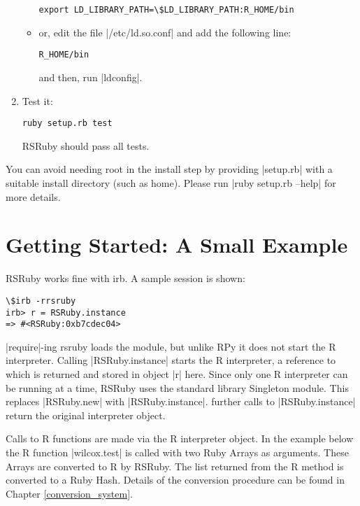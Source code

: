 \documentclass[a4paper,12pt]{book}
\begin{document}
\begin{enumerate}
\begin{itemize}
\begin{Verbatim}
export LD_LIBRARY_PATH=\$LD_LIBRARY_PATH:R_HOME/bin
\end{Verbatim}

\item or, edit the file |/etc/ld.so.conf| and add the following line:

\begin{Verbatim}
R_HOME/bin
\end{Verbatim}

  and then, run |ldconfig|.
\end{itemize}

\item Test it:

\begin{Verbatim}
ruby setup.rb test
\end{Verbatim}

RSRuby should pass all tests.

\end{enumerate}

You can avoid needing root in the install step by providing |setup.rb| with a suitable install directory (such as home). Please run |ruby setup.rb --help| for more details.

\section{Getting Started: A Small Example}

RSRuby works fine with irb. A sample session is shown:

\begin{Verbatim}
\$irb -rrsruby
irb> r = RSRuby.instance
=> #<RSRuby:0xb7cdec04>
\end{Verbatim}

|require|-ing rsruby loads the module, but unlike RPy it does not start the R interpreter. Calling |RSRuby.instance| starts the R interpreter, a reference to which is returned and stored in object |r| here. Since only one R interpreter can be running at a time, RSRuby uses the standard library Singleton module. This replaces |RSRuby.new| with |RSRuby.instance|. further calls to |RSRuby.instance| return the original interpreter object.

Calls to R functions are made via the R interpreter object. In the example below the R function |wilcox.test| is called with two Ruby Arrays as arguments. These Arrays are converted to R by RSRuby. The list returned from the R method is converted to a Ruby Hash. Details of the conversion procedure can be found in Chapter \ref{conversion_system}.
\end{document}
